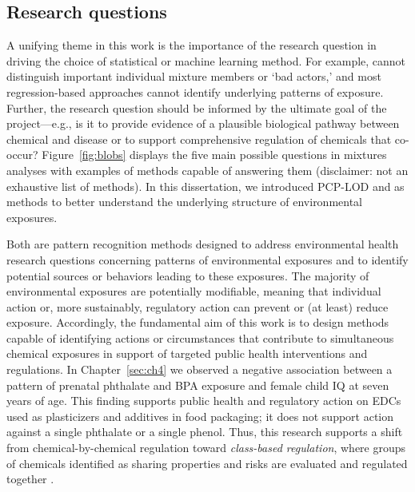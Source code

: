 \subsection{Research questions}\label{sec:question}
A unifying theme in this work is the importance of the research question in driving the choice of statistical or machine learning method. For example, \bnmf cannot distinguish important individual mixture members or `bad actors,' and most regression-based approaches cannot identify underlying patterns of exposure. Further, the research question should be informed by the ultimate goal of the project---e.g., is it to provide evidence of a plausible biological pathway between chemical and disease or to support comprehensive regulation of chemicals that co-occur? Figure~\ref{fig:blobs} displays the five main possible questions in mixtures analyses with examples of methods capable of answering them (disclaimer: not an exhaustive list of methods). In this dissertation, we introduced PCP-LOD and \bnmf as methods to better understand the underlying structure of environmental exposures.

Both are pattern recognition methods designed to address environmental health research questions concerning patterns of environmental exposures and to identify potential sources or behaviors leading to these exposures. The majority of environmental exposures are potentially modifiable, meaning that individual action or, more sustainably, regulatory action can prevent or (at least) reduce exposure. Accordingly, the fundamental aim of this work is to design methods capable of identifying actions or circumstances that contribute to simultaneous chemical exposures in support of targeted public health interventions and regulations. In Chapter~\ref{sec:ch4} we observed a negative association between a pattern of prenatal phthalate and BPA exposure and female child IQ at seven years of age. This finding supports public health and regulatory action on EDCs used as plasticizers and additives in food packaging; it does not support action against a single phthalate or a single phenol. Thus, this research supports a shift from chemical-by-chemical regulation toward \textit{class-based regulation}, where groups of chemicals identified as sharing properties and risks are evaluated and regulated together \cite{cordner2016can}.

